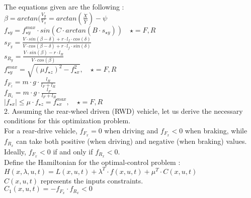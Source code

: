 \documentclass{article}
\begin{document}
The equations given are the following :\\

$\beta = arctan(\frac{V_{y}}{V_{x}} = arctan(\frac{\dot{X}}{\dot{Y}}) - \psi$\\

$f_{\star y} = f^{max}_{\star y} \cdot sin(C \cdot arctan(B \cdot s_{\star y})) \quad \star = F,R$\\

$s_{F_{y}} = \frac{V \cdot sin(\beta - \delta) + r \cdot l_{f} \cdot cos(\delta)}{V \cdot cos(\beta - \delta) + r \cdot l_{f} \cdot sin(\delta)}$\\

$s_{R_{y}} = \frac{V \cdot sin(\beta) - r \cdot l_{R}}{V \cdot cos(\beta)}$\\

$f^{max}_{\star y} = \sqrt{(\mu f_{\star z})^2 -f^2_{\star x}}, \quad \star = F,R$\\

$f_{F_{z}} = m \cdot g \cdot \frac{l_{R}}{l_{F} + l_{R}}$\\

$f_{R_{z}} = m \cdot g \cdot \frac{l_{F}}{l_{F} + l_{R}}$\\

$|f_{\star x}| \leq \mu \cdot f_{\star z} = f^{max}_{\star x}, \quad \star = F,R $\\


2. Assuming the rear-wheel driven (RWD) vehicle, let us derive the necessary conditions for this optimization problem. \\

For a rear-drive vehicle, 
$f_{F_{x}} = 0$ when driving and $f_{F_{x}} < 0$ when braking, while $f_{R_{x}}$ can take both positive (when driving) and negative (when braking) values.\\
Ideally, $f_{F_{x}} <0$ if and only if $f_{R_{x}} < 0$.\\

Define the Hamiltonian for the optimal-control problem : \\

$H(x,\lambda,u,t) = L(x,u,t) + \lambda^T \cdot f(x,u,t) + \mu^T \cdot C(x,u,t)$\\

$C(x,u,t)$ represents the inputs constraints. \\

$C_{1}(x,u,t) = - f_{F_{x}} \cdot f_{R_{x}} < 0$\\
\end{document}
